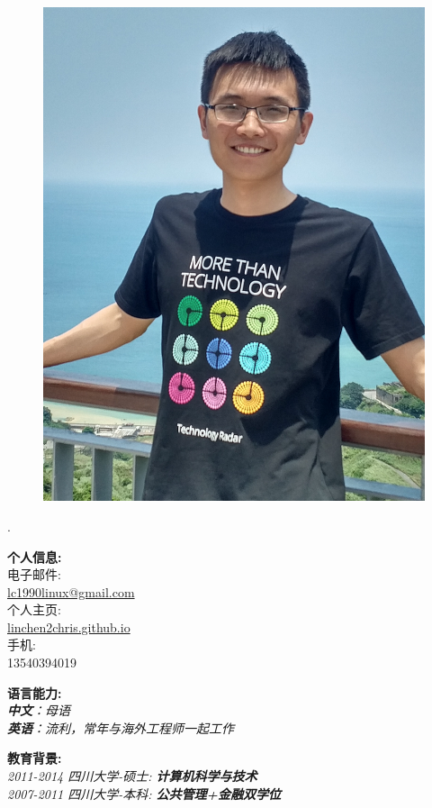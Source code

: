 \documentclass[a3paper,12pt,final]{memoir}
\newcommand{\myThemeColor}{RoyalBlue}
\newcommand{\SmallSep}{\vspace{0.9em}}
\newcommand{\CVItem}[1]
	{\textbf{\color{\myThemeColor} #1}}
\begin{document}
\begin{CJK*}{UTF8}{gbsn}%
\begin{figure}
	\hfill
	\includegraphics[width=0.7\columnwidth]{photo}
	\vspace{-7cm}
\end{figure}
\begin{flushright}\footnotesize
.\\
\vskip 6cm
\raggedright
\CVItem{{\large 个人信息:}}\\
电子邮件:\\
	\href{mailto:lc1990linux@gmail.com}{lc1990linux@gmail.com}  \\
	个人主页:\\
	\href{http://linchen2chris.github.io/}{linchen2chris.github.io} \\
	手机:\\ 13540394019	
  
	\CVItem{{\large 语言能力:}}\\
  \SmallSep
	\textit{\textbf{中文}：母语 \\\textbf{英语}：流利，常年与海外工程师一起工作\\}
	
  \vskip 1cm
  \CVItem{{\large 教育背景:}}\\
  \SmallSep
	\textit{2011-2014 四川大学-硕士: \textbf{计算机科学与技术}\\
    2007-2011 四川大学-本科: \textbf{公共管理+金融双学位}}


\end{flushright}
\end{CJK*}
\end{document}
